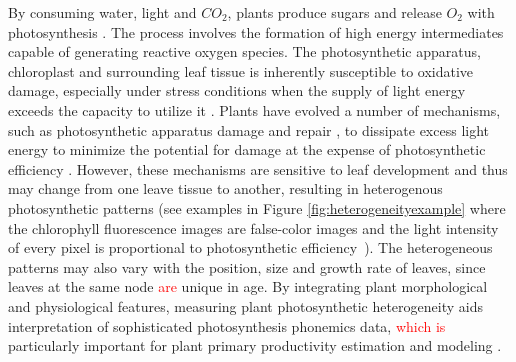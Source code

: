 \documentclass{bioinfo}
\begin{document}
By consuming water, light and $CO_2$, plants produce sugars and release $O_2$ with photosynthesis \citep{kramer2011importance}. The process involves the formation of high energy intermediates capable of generating reactive oxygen species. The photosynthetic apparatus, chloroplast and surrounding leaf tissue is inherently susceptible to oxidative damage, especially under stress conditions when the supply of light energy exceeds the capacity to utilize it \citep{durrant1990characterisation,asada1996radical}. Plants have evolved a number of mechanisms, such as photosynthetic apparatus damage and repair \citep{melis1999photosystem}, to dissipate excess light energy to minimize the potential for damage at the expense of photosynthetic efficiency \citep{adams2006energy,rochaix2014regulation}. However, these mechanisms are sensitive to leaf development and thus may change from one leave tissue to another, resulting in heterogenous photosynthetic patterns (see examples in Figure \ref{fig:heterogeneityexample} where the chlorophyll fluorescence images are false-color images and the light intensity of every pixel is proportional to photosynthetic efficiency~\citep{toet1996new}). The heterogeneous patterns may also vary with the position, size and growth rate of leaves, since leaves at the same node \textcolor{red}{are} %
unique in age. By integrating plant morphological and physiological features, measuring plant photosynthetic heterogeneity aids interpretation of %
sophisticated photosynthesis phonemics data, \textcolor{red}{which is} particularly important for plant primary productivity estimation and modeling \citep{meng2007spatial}.
\end{document}
